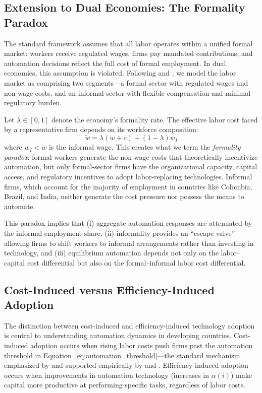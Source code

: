 \documentclass[5p,times,authoryear]{elsarticle}
\begin{document}
\subsection{Extension to Dual Economies: The Formality Paradox}
\label{subsec:dual_economy}

The standard framework assumes that all labor operates within a unified formal market: workers receive regulated wages, firms pay mandated contributions, and automation decisions reflect the full cost of formal employment. In dual economies, this assumption is violated. Following \citet{laporta2014} and \citet{ulyssea2018}, we model the labor market as comprising two segments---a formal sector with regulated wages and non-wage costs, and an informal sector with flexible compensation and minimal regulatory burden.

Let $\lambda \in [0,1]$ denote the economy's formality rate. The effective labor cost faced by a representative firm depends on its workforce composition:
\begin{equation}
\label{eq:effective_cost}
\tilde{w} = \lambda(w + c) + (1-\lambda) w_I
\end{equation}
where $w_I < w$ is the informal wage. This creates what we term the \emph{formality paradox}: formal workers generate the non-wage costs that theoretically incentivize automation, but only formal-sector firms have the organizational capacity, capital access, and regulatory incentives to adopt labor-replacing technologies. Informal firms, which account for the majority of employment in countries like Colombia, Brazil, and India, neither generate the cost pressure nor possess the means to automate.

This paradox implies that (i) aggregate automation responses are attenuated by the informal employment share, (ii) informality provides an ``escape valve'' allowing firms to shift workers to informal arrangements rather than investing in technology, and (iii) equilibrium automation depends not only on the labor--capital cost differential but also on the formal--informal labor cost differential.

\subsection{Cost-Induced versus Efficiency-Induced Adoption}
\label{subsec:cost_vs_efficiency}

The distinction between cost-induced and efficiency-induced technology adoption is central to understanding automation dynamics in developing countries. Cost-induced adoption occurs when rising labor costs push firms past the automation threshold in Equation~\ref{eq:automation_threshold}---the standard mechanism emphasized by \citet{acemoglu2019automation} and supported empirically by \citet{koch2021} and \citet{adachi2022}. Efficiency-induced adoption occurs when improvements in automation technology (increases in $\alpha(i)$) make capital more productive at performing specific tasks, regardless of labor costs.
\end{document}
